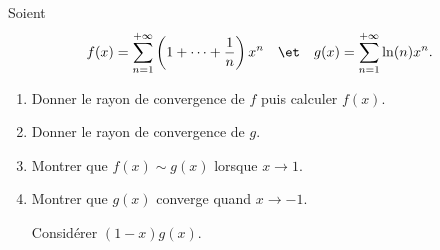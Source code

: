\begin{enonce}
\begin{exercise}[ID={RMS130 E717},subtitle={Mines-Ponts PSI 2019},tags={}, difficulty={0}]
Soient
\begin{equation*}
  f(x) = \sum_{n=1}^{+\infty} \left( 1 + \dots + \frac1n \right)x^n
  \quad\et\quad
  g(x) = \sum_{n=1}^{+\infty} \ln(n) x^n.
\end{equation*}
\begin{enumerate}
  \item Donner le rayon de convergence de $f$ puis calculer $f(x)$.
  \item Donner le rayon de convergence de $g$.
  \item Montrer que $f(x)\sim g(x)$ lorsque $x\to 1$.
  \item Montrer que $g(x)$ converge quand $x\to -1$.
        \begin{hint} Considérer $(1-x)g(x)$.  \end{hint}
\end{enumerate}

\end{exercise}
\begin{solution}
\end{solution}
\end{enonce}
